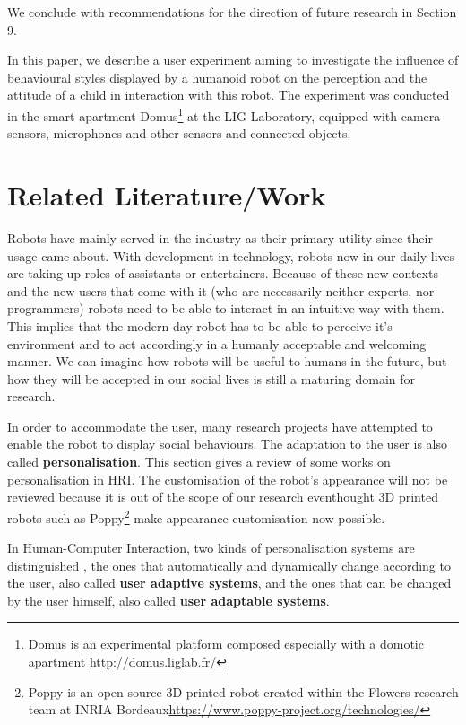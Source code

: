 \documentclass[smallextended]{svjour3}
\begin{document}
We conclude with recommendations for the direction of future research in Section 9.

In this paper, we describe a user experiment aiming to investigate the influence of behavioural styles displayed by a humanoid robot on the perception and the attitude of a child in interaction with this robot. 
The experiment was conducted in the smart apartment Domus\footnote{Domus is an experimental platform composed especially with a domotic apartment \url{http://domus.liglab.fr/}} at the LIG Laboratory, equipped with camera sensors, microphones and other sensors and connected objects. 



\section{Related Literature/Work}
Robots have mainly served in the industry as their primary utility since their usage came about.
With development in technology, robots now in our daily lives are taking up roles of assistants or entertainers. 
Because of these new contexts and the new users that come with it (who are necessarily neither experts, nor programmers) robots need to be able to interact in an intuitive way with them. 
This implies that the modern day robot has to be able to perceive it's environment and to act accordingly in a humanly acceptable and welcoming manner. 
We can imagine how robots will be useful to humans in the future, but how they will be accepted in our social lives is still a maturing domain for research.


In order to accommodate the user, many research projects have attempted to enable the robot to display social behaviours.
The adaptation to the user is also called \textbf{personalisation}.
This section gives a review of some works on personalisation in HRI.
The customisation of the robot's appearance will not be reviewed because it is out of the scope of our research eventhought 3D printed robots such as Poppy\footnote{Poppy is an open source 3D printed robot created within the Flowers research team at INRIA Bordeaux\url{https://www.poppy-project.org/technologies/}} make appearance customisation now possible.  

In Human-Computer Interaction, two kinds of personalisation systems are distinguished \cite{Fischer2001,Oppermann1997}, the ones that automatically and dynamically change according to the user, also called \textbf{user adaptive systems}, and the ones that can be changed by the user himself, also called \textbf{user adaptable systems}. 
\end{document}
